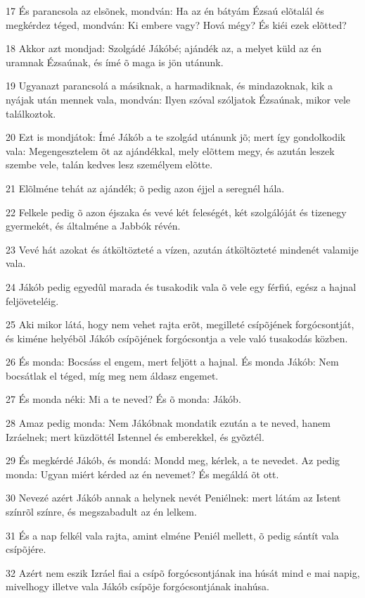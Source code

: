 \par 17 És parancsola az elsõnek, mondván: Ha az én bátyám Ézsaú elõtalál és megkérdez téged, mondván: Ki embere vagy? Hová mégy? És kiéi ezek elõtted?
\par 18 Akkor azt mondjad: Szolgádé Jákóbé; ajándék az, a melyet küld az én uramnak Ézsaúnak, és ímé õ maga is jön utánunk.
\par 19 Ugyanazt parancsolá a másiknak, a harmadiknak, és mindazoknak, kik a nyájak után mennek vala, mondván: Ilyen szóval szóljatok Ézsaúnak, mikor vele találkoztok.
\par 20 Ezt is mondjátok: Ímé Jákób a te szolgád utánunk jõ; mert így gondolkodik vala: Megengesztelem õt az ajándékkal, mely elõttem megy, és azután leszek szembe vele, talán kedves lesz személyem elõtte.
\par 21 Elõlméne tehát az ajándék; õ pedig azon éjjel a seregnél hála.
\par 22 Felkele pedig õ azon éjszaka és vevé két feleségét, két szolgálóját és tizenegy gyermekét, és általméne a Jabbók révén.
\par 23 Vevé hát azokat és átköltözteté a vízen, azután átköltözteté mindenét valamije vala.
\par 24 Jákób pedig egyedûl marada és tusakodik vala õ vele egy férfiú, egész a hajnal feljöveteléig.
\par 25 Aki mikor látá, hogy nem vehet rajta erõt, megilleté csípõjének forgócsontját, és kiméne helyébõl Jákób csípõjének forgócsontja a vele való tusakodás közben.
\par 26 És monda: Bocsáss el engem, mert feljött a hajnal. És monda Jákób: Nem bocsátlak el téged, míg meg nem áldasz engemet.
\par 27 És monda néki: Mi a te neved? És õ monda: Jákób.
\par 28 Amaz pedig monda: Nem Jákóbnak mondatik ezután a te neved, hanem Izráelnek; mert küzdöttél Istennel és emberekkel, és gyõztél.
\par 29 És megkérdé Jákób, és mondá: Mondd meg, kérlek, a te nevedet. Az pedig monda: Ugyan miért kérded az én nevemet? És megáldá õt ott.
\par 30 Nevezé azért Jákób annak a helynek nevét Peniélnek: mert látám az Istent színrõl színre, és megszabadult az én lelkem.
\par 31 És a nap felkél vala rajta, amint elméne Peniél mellett, õ pedig sántít vala csípõjére.
\par 32 Azért nem eszik Izráel fiai a csípõ forgócsontjának ina húsát mind e mai napig, mivelhogy illetve vala Jákób csípõje forgócsontjának inahúsa.

